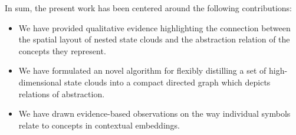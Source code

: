In sum, the present work has been centered around the following contributions:

\begin{itemize}
    \item We have provided qualitative evidence highlighting the connection between the spatial layout of nested state clouds and the abstraction relation of the concepts they represent.
    \item We have formulated an novel algorithm for flexibly distilling a set of high-dimensional state clouds into a compact directed graph which depicts relations of abstraction.
    \item We have drawn evidence-based observations on the way individual symbols relate to concepts in contextual embeddings.
\end{itemize}
